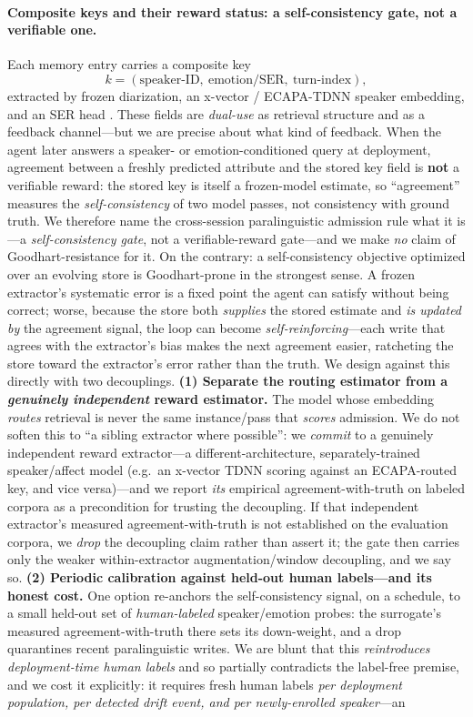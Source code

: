 \paragraph{Composite keys and their reward status: a self-consistency gate, not a verifiable one.} Each memory entry carries a composite key
\[
k = (\text{speaker-ID},\ \text{emotion/SER},\ \text{turn-index}),
\]
extracted by frozen diarization, an x-vector / ECAPA-TDNN speaker embedding, and an SER head \citep{xvector2021,ecapatdnn2020}. These fields are \emph{dual-use} as retrieval structure and as a feedback channel---but we are precise about what kind of feedback. When the agent later answers a speaker- or emotion-conditioned query at deployment, agreement between a freshly predicted attribute and the stored key field is \textbf{not} a verifiable reward: the stored key is itself a frozen-model estimate, so ``agreement'' measures the \emph{self-consistency} of two model passes, not consistency with ground truth. We therefore name the cross-session paralinguistic admission rule what it is---a \emph{self-consistency gate}, not a verifiable-reward gate---and we make \emph{no} claim of Goodhart-resistance for it. On the contrary: a self-consistency objective optimized over an evolving store is Goodhart-prone in the strongest sense. A frozen extractor's systematic error is a fixed point the agent can satisfy without being correct; worse, because the store both \emph{supplies} the stored estimate and \emph{is updated by} the agreement signal, the loop can become \emph{self-reinforcing}---each write that agrees with the extractor's bias makes the next agreement easier, ratcheting the store toward the extractor's error rather than the truth. We design against this directly with two decouplings. \textbf{(1) Separate the routing estimator from a \emph{genuinely independent} reward estimator.} The model whose embedding \emph{routes} retrieval is never the same instance/pass that \emph{scores} admission. We do not soften this to ``a sibling extractor where possible'': we \emph{commit} to a genuinely independent reward extractor---a different-architecture, separately-trained speaker/affect model (e.g.\ an x-vector TDNN scoring against an ECAPA-routed key, and vice versa)---and we report \emph{its} empirical agreement-with-truth on labeled corpora as a precondition for trusting the decoupling. If that independent extractor's measured agreement-with-truth is not established on the evaluation corpora, we \emph{drop} the decoupling claim rather than assert it; the gate then carries only the weaker within-extractor augmentation/window decoupling, and we say so. \textbf{(2) Periodic calibration against held-out human labels---and its honest cost.} One option re-anchors the self-consistency signal, on a schedule, to a small held-out set of \emph{human-labeled} speaker/emotion probes: the surrogate's measured agreement-with-truth there sets its down-weight, and a drop quarantines recent paralinguistic writes. We are blunt that this \emph{reintroduces deployment-time human labels} and so partially contradicts the label-free premise, and we cost it explicitly: it requires fresh human labels \emph{per deployment population, per detected drift event, and per newly-enrolled speaker}---an 